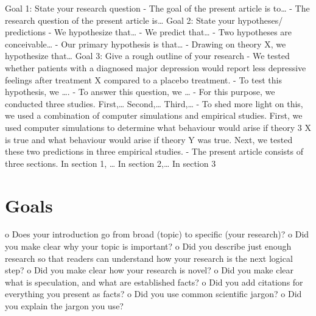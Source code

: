 Goal 1: State your research question
- The goal of the present article is to…
- The research question of the present article is…
Goal 2: State your hypotheses/ predictions
- We hypothesize that…
- We predict that…
- Two hypotheses are conceivable…
- Our primary hypothesis is that…
- Drawing on theory X, we hypothesize that…
Goal 3: Give a rough outline of your research
- We tested whether patients with a diagnosed major depression would report less depressive
feelings after treatment X compared to a placebo treatment.
- To test this hypothesis, we ….
- To answer this question, we …
- For this purpose, we conducted three studies. First,… Second,… Third,…
- To shed more light on this, we used a combination of computer simulations and empirical
studies. First, we used computer simulations to determine what behaviour would arise if theory
3
X is true and what behaviour would arise if theory Y was true. Next, we tested these two
predictions in three empirical studies.
- The present article consists of three sections. In section 1, … In section 2,… In section 3

\section{Goals}
\label{chapter1-goals}

o Does your introduction go from broad (topic) to specific (your research)?
o Did you make clear why your topic is important?
o Did you describe just enough research so that readers can understand how your
research is the next logical step?
o Did you make clear how your research is novel?
o Did you make clear what is speculation, and what are established facts?
o Did you add citations for everything you present as facts?
o Did you use common scientific jargon?
o Did you explain the jargon you use?

